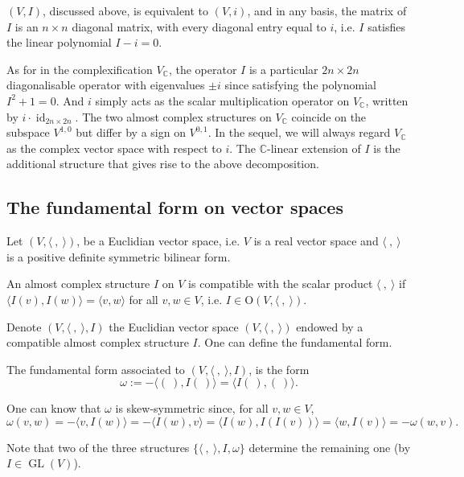 \documentclass{ctexart}
\begin{document}
$(V,I)$, discussed above, is equivalent to $(V,i)$, and in any basis, the matrix of $I$ is an $n\times n$ diagonal matrix, with every diagonal entry equal to $i$, i.e.
$I$ satisfies the linear polynomial $I-i=0$.

As for in the complexification $V_\mathbb{C}$, the operator $I$ is a particular $2n\times 2n$ diagonalisable operator with eigenvalues $\pm i$ since satisfying the polynomial $I^2+1=0$.
And $i$ simply acts as the scalar multiplication operator on $V_\mathbb{C}$, written by $i\cdot \operatorname{id}_{2n\times 2n}$. 
The two almost complex structures on $V_{\mathbb{C}}$ coincide on the subspace $V^{1,0}$ but differ by a sign on $V^{0,1}$. In the sequel, we will always 
regard $V_{\mathbb{C}}$ as the complex vector space with respect to $i$. The $\mathbb{C}$-linear extension of $I$ is the additional structure that gives rise to the above decomposition. 

\subsection*{The fundamental form on vector spaces}

Let $(V,\langle\ ,\ \rangle)$, be a Euclidian vector space, i.e. $V$ is a real vector space and $\langle\ ,\ \rangle$ is a positive definite symmetric bilinear form.

\begin{definition}[Compatible]
  An almost complex structure $I$ on $V$ is compatible with the scalar product $\langle\ ,\ \rangle$ if $\langle I(v), I(w)\rangle=\langle v, w\rangle$ for all $v, w \in V$, 
  i.e. $I \in \mathrm{O}(V,\langle\ ,\ \rangle)$. 
\end{definition}

Denote $(V,\langle\ ,\ \rangle, I)$ the Euclidian vector space $(V,\langle\ ,\ \rangle)$ endowed by a compatible almost complex structure $I$. One can define the fundamental form.
\begin{definition}
  The fundamental form associated to $(V,\langle\ ,\ \rangle, I)$, is the form
  $$
  \omega:=-\langle(\ ), I(\ )\rangle=\langle I(\ ),(\ )\rangle .
  $$
\end{definition}
One can know that $\omega$ is skew-symmetric since, for all $v, w \in V$, 
$$
\omega(v,w)=-\langle v, I(w)\rangle=-\langle I(w), v\rangle=\langle I(w), I(I(v))\rangle=\langle w, I(v)\rangle=-\omega(w,v).
$$

Note that two of the three structures $\{\langle\ ,\ \rangle, I, \omega\}$ determine the remaining one (by $I \in \operatorname{GL}(V)$).
\end{document}
